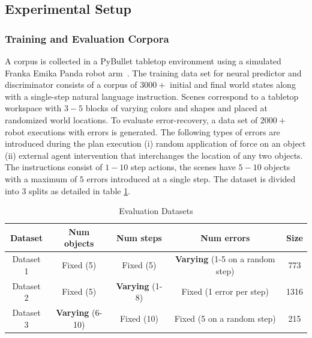 \subsection{Experimental Setup}\label{sec:experiments}

\subsubsection{Training and Evaluation Corpora} 
%
A corpus is collected in a PyBullet tabletop environment using a simulated Franka Emika Panda robot arm~\citep{haddadin2022franka}. The training data set for neural predictor and discriminator consists of a corpus of $3000+$ initial and final world states along with a single-step natural language instruction. 
%
Scenes correspond to a tabletop workspace with $3-5$ blocks of varying colors and shapes and placed at randomized world locations. 
%
To evaluate error-recovery, a data set of $2000+$ robot executions with errors is generated. The following types of errors are introduced during the plan execution (i) random application of force on an object (ii) external agent intervention that interchanges the location of any two objects. The instructions consist of $1-10$ step actions, the scenes have $5-10$ objects 
with a maximum of $5$ errors introduced at a single step. The dataset is divided into 3 splits as detailed in table \ref{tab:eval-error}.

\begin{table}[]
    \centering
    \begin{tabular}{|c|c|c|c|c|}
         \hline
         \textbf{Dataset} & \textbf{Num objects} & \textbf{Num steps} & \textbf{Num errors} & \textbf{Size} \\
         \hline
         Dataset 1 & Fixed (5) & Fixed (5) & \textbf{Varying} (1-5 on a random step) & 773  \\
         Dataset 2 & Fixed (5) & \textbf{Varying} (1-8) & Fixed (1 error per step) & 1316 \\
         Dataset 3 & \textbf{Varying} (6-10) & Fixed (10) & Fixed (5 on a random step) & 215 \\ 
         \hline
    \end{tabular}
    \caption{Evaluation Datasets}
    \label{tab:eval-error}
\end{table}



